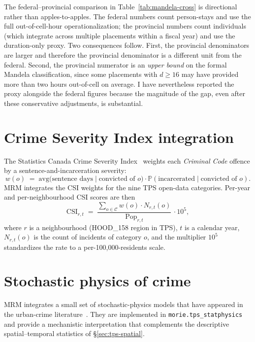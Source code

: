 \documentclass[11pt,a4paper]{article}
\theoremstyle{plain}
\theoremstyle{definition}
\theoremstyle{remark}
\newcommand{\PP}{\mathbb{P}}
\begin{document}
The federal--provincial comparison in
Table~\ref{tab:mandela-cross} is directional rather than
apples-to-apples. The federal numbers count person-stays and use
the full out-of-cell-hour operationalization; the provincial
numbers count individuals (which integrate across multiple
placements within a fiscal year) and use the duration-only proxy.
Two consequences follow. First, the provincial denominators are
larger and therefore the provincial denominator is a different
unit from the federal. Second, the provincial numerator is an
\emph{upper bound} on the formal Mandela classification, since
some placements with $d \ge 16$ may have provided more than two
hours out-of-cell on average. I have nevertheless reported the
proxy alongside the federal figures because the magnitude of the
gap, even after these conservative adjustments, is substantial.

\section{Crime Severity Index integration}
\label{sec:csi}

The Statistics Canada Crime Severity
Index~\cite{Wallace2009CSI} weights each \emph{Criminal Code}
offence by a sentence-and-incarceration severity:
\begin{equation}
  w(o) \;=\; \mathrm{avg}\bigl(\text{sentence days} \mid \text{convicted of } o\bigr)
   \cdot \PP(\text{incarcerated} \mid \text{convicted of } o).
  \label{eq:csi-weight}
\end{equation}
MRM integrates the CSI weights for the nine TPS open-data
categories. Per-year and per-neighbourhood CSI scores are then
\begin{equation}
  \mathrm{CSI}_{r, t}
  \;=\;
  \frac{\displaystyle\sum_{o \in \mathcal{C}}
   w(o) \cdot N_{r, t}(o)}
       {\mathrm{Pop}_{r, t}}\, \cdot 10^{5},
  \label{eq:csi-rate}
\end{equation}
where $r$ is a neighbourhood (HOOD\_158 region in TPS), $t$ is a
calendar year, $N_{r,t}(o)$ is the count of incidents of category
$o$, and the multiplier $10^{5}$ standardizes the rate to a
per-100,000-residents scale.

\section{Stochastic physics of crime}
\label{sec:tps-physics}

MRM integrates a small set of stochastic-physics models that
have appeared in the urban-crime
literature~\cite{Bettencourt2007, ShortBrantingham2008}. They are
implemented in \texttt{morie.tps\_statphysics} and provide a
mechanistic interpretation that complements the descriptive
spatial--temporal statistics of \S\ref{sec:tps-spatial}.
\end{document}
